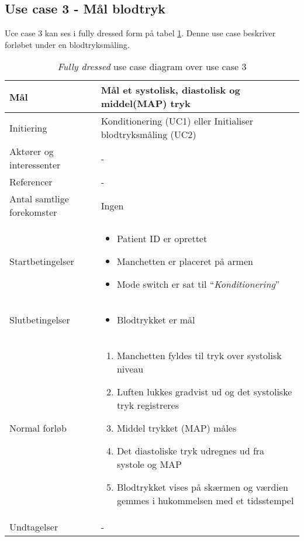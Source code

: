 	\subsection{Use case 3 - Mål blodtryk} \label{title:uc3}
	Uce case 3 kan ses i fully dressed form på tabel \ref{tab:uc3}. Denne use case beskriver forløbet under en blodtryksmåling.
	\begin{table}[H]
		\begin{center}
			\begin{tabular}{ | p{} | p{}| } 
				\hline
				Mål & Mål et systolisk, diastolisk og middel(MAP) tryk\\ 
				\hline
				Initiering &  Konditionering (UC1) eller Initialiser blodtryksmåling (UC2)\\
				\hline
				Aktører og interessenter & - \\
				\hline
				Referencer & - \\ 
				\hline
				Antal samtlige forekomster & Ingen\\ 
				\hline	
				Startbetingelser & 
				\begin{itemize}
					\item Patient ID er oprettet
					\item Manchetten er placeret på armen
					\item Mode switch er sat til “\textit{Konditionering}”
				\end{itemize} \\ 
				\hline
				Slutbetingelser & 
				\begin{itemize}
					\item Blodtrykket er mål
				\end{itemize} \\ 
				\hline
				Normal forløb & \begin{enumerate}
					\setlength\itemsep{0cm} %
					\item Manchetten fyldes til tryk over systolisk niveau 
					\item Luften lukkes gradvist ud og det systoliske tryk registreres 
					\item Middel trykket (MAP) måles 
					\item Det diastoliske tryk udregnes ud fra systole og MAP 
					\item Blodtrykket vises på skærmen og værdien gemmes i hukommelsen med et tidsstempel 
				\end{enumerate} \\ 
				\hline
				Undtagelser & -\\ 
				\hline
			\end{tabular}
		\end{center}
			\caption{\textit{Fully dressed} use case diagram over use case 3} \label{tab:uc3}
			\end{table}
			\newpage